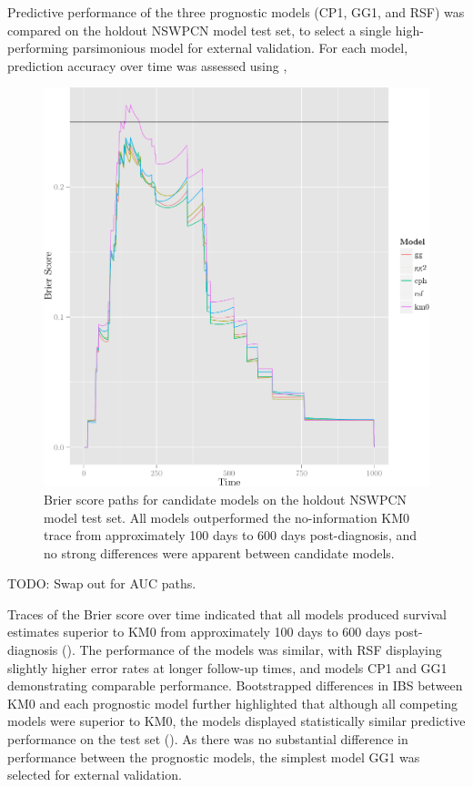 \documentclass[dissertation.tex]{subfiles}
\begin{document}
Predictive performance of the three prognostic models (CP1, GG1, and RSF) was compared on the holdout \gls{NSWPCN} model test set, to select a single high-performing parsimonious model for external validation.  For each model, prediction accuracy over time was assessed using , 


\begin{figure}
\centering
  \includegraphics[width=.7\linewidth]{analysis/nomogram/figure/05-model-selection-bs-paths-1}
  \caption[Brier score paths for candidate models on holdout data]{Brier score paths for candidate models on the holdout \gls{NSWPCN} model test set.  All models outperformed the no-information KM0 trace from approximately 100 days to 600 days post-diagnosis, and no strong differences were apparent between candidate models.}
\label{fig:nomo-brier-paths}
\end{figure}

TODO: Swap out for AUC paths.

Traces of the Brier score over time indicated that all models produced survival estimates superior to KM0 from approximately 100 days to 600 days post-diagnosis ().  The performance of the models was similar, with RSF displaying slightly higher error rates at longer follow-up times, and models CP1 and GG1 demonstrating comparable performance.  Bootstrapped differences in \gls{IBS} between KM0 and each prognostic model further highlighted that although all competing models were superior to KM0, the models displayed statistically similar predictive performance on the test set ().  As there was no substantial difference in performance between the prognostic models, the simplest model GG1 was selected for external validation.
\end{document}
